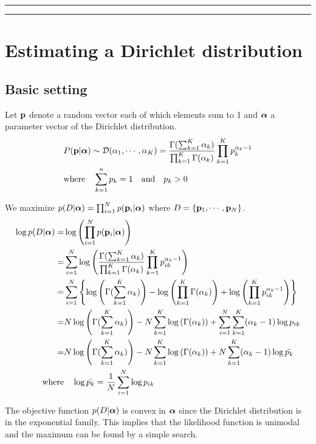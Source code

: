 \documentclass[10.5pt,letterpaper]{article}
\theoremstyle{plain}
\begin{document}
\noindent\rule{17.5cm}{1.7pt}
\vspace{-1.8cm}
\tableofcontents
\noindent\rule{17.5cm}{1.7pt}

\section{Estimating a Dirichlet distribution}
\subsection{Basic setting}

Let $\mathbf{p}$ denote a random vector each of which elements sum to 1 and $\boldsymbol{\alpha}$ a parameter vector of the Dirichlet distribution.
\begin{align}
& P( \mathbf{p} | \boldsymbol{\alpha} ) \sim \mathcal{D}( \alpha_1,\cdots , \alpha_K) = 
 \frac{ \Gamma(\sum_{k=1}^K \alpha_k)}{\prod_{k=1}^K \Gamma(\alpha_k)} \prod_{k=1}^K p_k^{\alpha_k - 1} \\
& \textrm{where} \quad \sum_{k=1}^{n} p_k = 1  \quad \textrm{and} \quad p_k > 0
\end{align}

We maximize $p(D | \boldsymbol{\alpha}) = \prod_{i=1}^N p(\mathbf{p}_i | \boldsymbol{\alpha})$ where $D = \{ \mathbf{p}_1, \cdots, \mathbf{p}_N \}$.
\begin{align}
\log p(D | \boldsymbol{\alpha} ) =& \log \left( \prod_{i=1}^N p (\mathbf{p}_i | \boldsymbol{\alpha}) \right) \\
	=& \sum_{i=1}^N \log \left( \frac{ \Gamma(\sum_{k=1}^K \alpha_k)}{\prod_{k=1}^K \Gamma(\alpha_k)} \prod_{k=1}^K p_{ik}^{\alpha_k - 1} \right) \\
	=& \sum_{i=1}^N \left\{ \log \left( \Gamma(\sum_{k=1}^K \alpha_k) \right) - \log \left( \prod_{k=1}^K \Gamma(\alpha_k) \right) + \log \left( \prod_{k=1}^K p_{ik}^{\alpha_k - 1} \right) \right\} \\
	=& N  \log \left( \Gamma(\sum_{k=1}^K \alpha_k) \right) - N \sum_{k=1}^K \log \left( \Gamma(\alpha_k) \right) 
+ \sum_{i=1}^N  \sum_{k=1}^K (\alpha_k - 1) \log p_{ik}  \\
	=& N  \log \left( \Gamma(\sum_{k=1}^K \alpha_k) \right) - N \sum_{k=1}^K \log \left( \Gamma(\alpha_k) \right) 
+ N  \sum_{k=1}^K (\alpha_k - 1) \log  \bar{p_{k}} \label{log1} \\
	\textrm{where} & \quad \log \bar{p_k}  = \frac{1}{N} \sum_{i=1}^N \log p_{ik} 
\end{align}

The objective function $p(D | \boldsymbol{\alpha} )$ is convex in $\boldsymbol{\alpha}$ since the Dirichlet distribution is in the exponential family.
This implies that the likelihood function is unimodal and the maximum can be found by a simple search.
\end{document}
